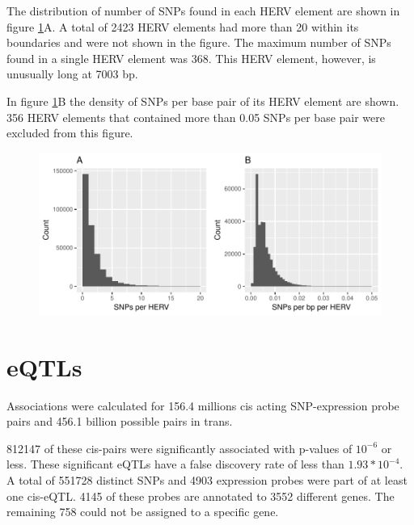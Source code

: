 \documentclass[a4paper,12pt,twoside,openright]{report}
\begin{document}
The distribution of number of SNPs found in each HERV element are shown in figure \ref{fig:hervS2.snp.hist}A. A total of 2423 HERV elements had more than 20 within its boundaries and were not shown in the figure. The maximum number of SNPs found in a single HERV element was 368. This HERV element, however, is unusually long at 7003 bp. 

In figure \ref{fig:hervS2.snp.hist}B the density of SNPs per base pair of its HERV element are shown. 356 HERV elements that contained more than 0.05 SNPs per base pair were excluded from this figure.

\begin{figure}[tb]
	\includegraphics[scale = 1, keepaspectratio = true]{../figures/hervS2_snp_hist}  
	\caption{}
    \label{fig:hervS2.snp.hist}
\end{figure}



\section{eQTLs}
\label{Results:eQTLs}
Associations were calculated for 156.4 millions cis acting SNP-expression probe pairs and 456.1 billion possible pairs in trans. 

812147 of these cis-pairs were significantly associated with p-values of $10^{-6}$ or less. These significant eQTLs have a false discovery rate of less than $1.93*10^{-4}$. A total of 551728 distinct SNPs and 4903 expression probes were part of at least one cis-eQTL. 4145 of these probes are annotated to 3552 different genes. The remaining 
758 could not be assigned to a specific gene.
\end{document}

